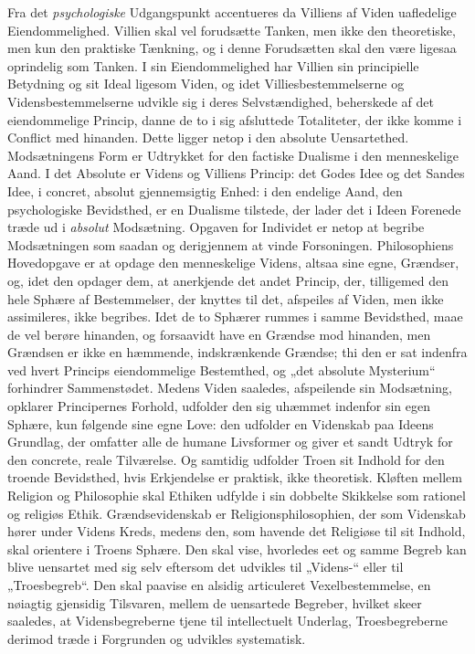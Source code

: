 \documentclass[12pt,a4paper]{book}
\newcommand{\opage}[1]{\marginnote{\footnotesize\textit{[#1]}}}
\begin{document}
Fra det \emph{psychologiske} Udgangspunkt accentueres da Villiens af Viden
uafledelige Eiendommelighed. Villien skal vel forudsætte Tanken, men
ikke den theoretiske, men kun den praktiske Tænkning, og i denne
Forudsætten skal den være ligesaa oprindelig som Tanken. I sin
Eiendommelighed har Villien sin principielle Betydning og sit Ideal
ligesom Viden, og idet Villiesbestemmelserne og Vidensbestemmelserne
udvikle sig i deres Selvstændighed, beherskede af det eiendommelige
Princip, danne de to i sig afsluttede Totaliteter, der ikke komme i
Conflict med hinanden. Dette ligger netop i den absolute Uensartethed.
Modsætningens Form er Udtrykket for den factiske Dualisme i den
menneskelige Aand. I det Absolute er Videns og Villiens Princip: det
Godes Idee og det Sandes Idee, i concret, absolut gjennemsigtig Enhed:
i den endelige Aand, den psychologiske Bevidsthed, er en Dualisme
tilstede, der lader det i Ideen Forenede træde ud i \emph{absolut} Modsætning. Opgaven for Individet er netop at begribe Modsætningen
som saadan og derigjennem at vinde Forsoningen. Philosophiens
Hoved\opage{128}opgave er at opdage den menneskelige Videns, altsaa sine egne,
Grændser, og, idet den opdager dem, at anerkjende det andet Princip,
der, tilligemed den hele Sphære af Bestemmelser, der knyttes til det,
afspeiles af Viden, men ikke assimileres, ikke begribes. Idet de to
Sphærer rummes i samme Bevidsthed, maae de vel berøre hinanden, og
forsaavidt have en Grændse mod hinanden, men Grændsen er ikke en
hæmmende, indskrænkende Grændse; thi den er sat indenfra ved hvert
Princips eiendommelige Bestemthed, og „det absolute Mysterium“
forhindrer Sammenstødet. Medens Viden saaledes, afspeilende sin
Modsætning, opklarer Principernes Forhold, udfolder den sig uhæmmet
indenfor sin egen Sphære, kun følgende sine egne Love: den udfolder en
Videnskab paa Ideens Grundlag, der omfatter alle de humane Livsformer
og giver et sandt Udtryk for den concrete, reale Tilværelse. Og
samtidig udfolder Troen sit Indhold for den troende Bevidsthed, hvis
Erkjendelse er praktisk, ikke theoretisk. Kløften mellem Religion og
Philosophie skal Ethiken udfylde i sin dobbelte Skikkelse som rationel
og religiøs Ethik. Grændsevidenskab er Religionsphilosophien, der som
Videnskab hører under Videns Kreds, medens den, som havende det
Religiøse til sit Indhold, skal orientere i Troens Sphære. Den skal
vise, hvorledes eet og samme Begreb kan blive uensartet med sig selv
eftersom det udvikles til „Videns-“ eller til „Troesbegreb“. Den
skal paavise en alsidig articuleret Vexelbestemmelse, en nøiagtig
gjensidig Tilsvaren, mellem de uensartede Begreber, hvilket skeer
saaledes, at Vidensbegreberne tjene til intellectuelt Underlag,
Troesbegreberne derimod træde i Forgrunden og udvikles systematisk.
\end{document}
